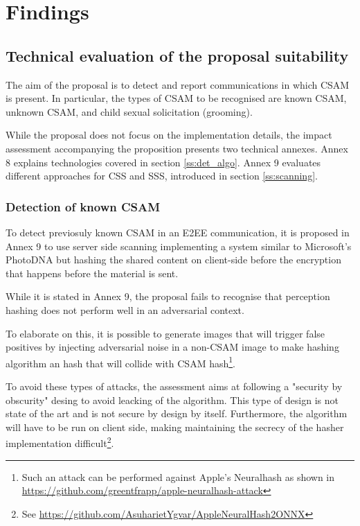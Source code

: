 \section{Findings}

\subsection{Technical evaluation of the proposal suitability}

The aim of the proposal is to detect and report communications in which CSAM is present. In particular, the types of CSAM to be recognised are known CSAM, unknown CSAM, and child sexual solicitation (grooming).

While the proposal does not focus on the implementation details, the impact assessment accompanying the proposition presents two technical annexes. Annex 8 explains technologies covered in section \ref{ss:det_algo}. Annex 9 evaluates different approaches for CSS and SSS, introduced in section \ref{ss:scanning}.

\subsubsection{Detection of known CSAM}

To detect previosuly known CSAM in an E2EE communication, it is proposed in Annex 9 to use server side scanning implementing a system similar to Microsoft's PhotoDNA but hashing the shared content on client-side before the encryption that happens before the material is sent\cite{eu2022impact}. 

While it is stated in Annex 9, the proposal fails to recognise that perception hashing does not perform well in an adversarial context. 

To elaborate on this, it is possible to generate images that will trigger false positives by injecting adversarial noise in a non-CSAM image to make hashing algorithm an hash that will collide with CSAM hash\footnote{Such an attack can be performed against Apple's Neuralhash as shown in \url{https://github.com/greentfrapp/apple-neuralhash-attack}}.

To avoid these types of attacks, the assessment aims at following a "security by obscurity" desing to avoid leacking of the algorithm. This type of design is not state of the art and is not secure by design by itself\cite{SandO}. Furthermore, the algorithm will have to be run on client side, making maintaining the secrecy of the hasher implementation difficult\footnote{See \url{https://github.com/AsuharietYgvar/AppleNeuralHash2ONNX}}.

